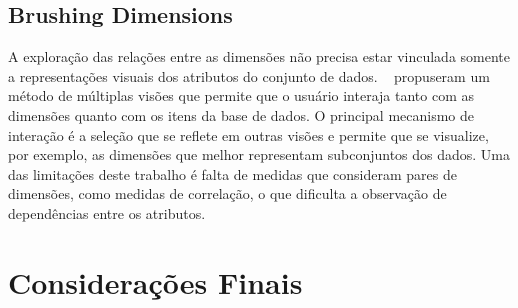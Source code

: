 \subsection{Brushing Dimensions}

A exploração das relações entre as dimensões não precisa estar vinculada somente a representações visuais dos atributos do conjunto de dados. \citeauthor{Turkay2011}~\cite{Turkay2011} propuseram um método de múltiplas visões que permite que o usuário interaja tanto com as dimensões quanto com os itens da base de dados. O principal mecanismo de interação é a seleção que se reflete em outras visões e permite que se visualize, por exemplo, as dimensões que melhor representam subconjuntos dos dados. Uma das limitações deste trabalho é falta de medidas que consideram pares de dimensões, como medidas de correlação, o que dificulta a observação de dependências entre os atributos.  

\section{Considerações Finais}









